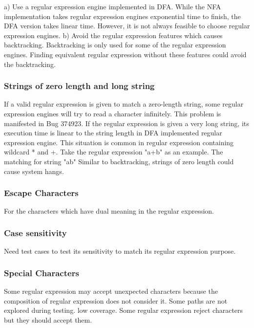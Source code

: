  a) Use a regular expression engine implemented in DFA. While the NFA implementation takes regular expression engines exponential time to finish, the DFA version takes linear time. However, it is not always feasible to choose regular expression engines. b) Avoid the regular expression features which causes backtracking. Backtracking is only used for some of the regular expression engines. Finding equivalent regular expression without these features could avoid the backtracking.

\subsubsection{Strings of zero length and long string} If a valid regular expression is given to match a zero-length string, some regular expression engines will try to read a character infinitely. This problem is manifested in Bug 374923. If the regular expression is given a very long string, its execution time is linear to the string length in DFA implemented regular expression engine. This situation is common in regular expression containing wildcard * and +. Take the regular expression "a+b" as an example. The matching for string "ab" 
 Similar to backtracking, strings of zero length could cause system hangs.
\subsubsection{Escape Characters}
For the characters which have dual meaning in the regular expression.
\subsubsection{Case sensitivity}
Need test cases to test its sensitivity to match its regular expression purpose.
\subsubsection{Special Characters}
Some regular expression may accept unexpected characters because the composition of regular expression does not consider it. Some paths are not explored during testing. low coverage.
Some regular expression reject characters but they should accept them.

